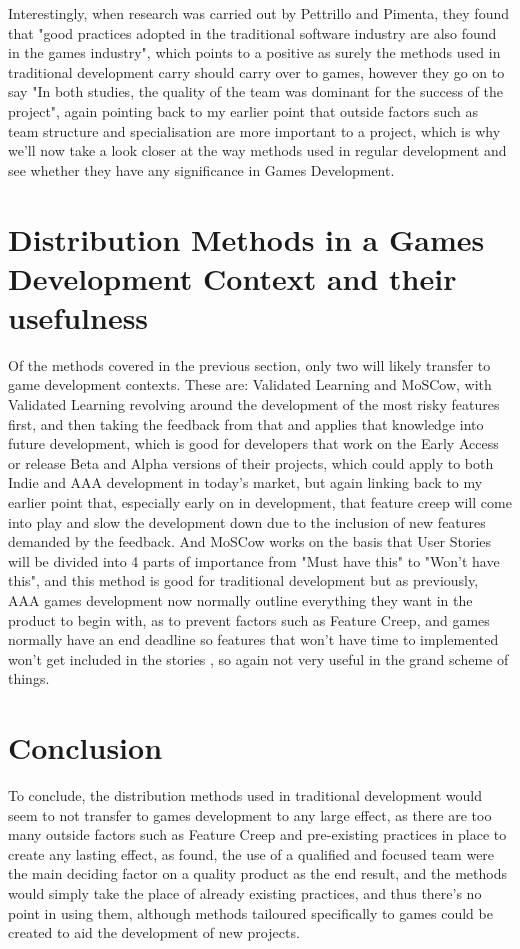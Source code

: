 \documentclass{scrartcl}
\begin{document}
Interestingly, when research was carried out by Pettrillo and Pimenta, they found that "good practices adopted in the traditional software industry are also found in the games industry"\cite[p. 12]{petrillo2010agility}, which points to a positive as surely the methods used in traditional development carry should carry over to games, however they go on to say "In both studies, the quality of the team was dominant for the success of the project"\cite[p. 12]{petrillo2010agility}, again pointing back to my earlier point that outside factors such as team structure and specialisation are more important to a project,  which is why we'll now take a look closer at the way methods used in regular development and see whether they have any significance in Games Development.

\section{Distribution Methods in a Games Development Context and their usefulness}
Of the methods covered in the previous section, only two will likely transfer to game development contexts. These are: Validated Learning and MoSCow\cite[p. 156]{popli2014prioritising}, with Validated Learning revolving around the development of the most risky features first, and then taking the feedback from that and applies that knowledge into future development, which is good for developers that work on the Early Access or release Beta and Alpha versions of their projects, which could apply to both Indie and AAA development in today's market, but again linking back to my earlier point that, especially early on in development, that feature creep will come into play and slow the development down due to the inclusion of new features demanded by the feedback. And MoSCow works on the basis that User Stories will be divided into 4 parts of importance from "Must have this" to "Won't have this"\cite[p. 156]{popli2014prioritising}, and this method is good for traditional development but as previously, AAA games development now normally outline everything they want in the product to begin with, as to prevent factors such as Feature Creep, and games normally have an end deadline so features that won't have time to implemented won't get included in the stories , so again not very useful in the grand scheme of things. 


\section{Conclusion}
To conclude, the distribution methods used in traditional development would seem to not transfer to games development to any large effect, as there are too many outside factors such as Feature Creep and pre-existing practices in place to create any lasting effect, as found, the use of a qualified and focused team were the main deciding factor on a quality product as the end result, and the methods would simply take the place of already existing practices, and thus there's no point in using them, although methods tailoured specifically to games could be created to aid the development of new projects.
\end{document}
